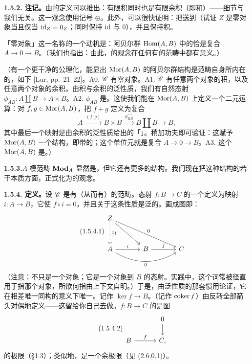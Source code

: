 \textbf{1.5.2. 注记。}\quad 由\trAdditiveCategory{}的定义可以推出：有限积同时也是有限余积（即和）——细节与我们无关。这一观念使用记号 $\oplus$。此外，可以很快证明：\trAdditiveFunctor{}把\trZeroObject{}送到\trZeroObject{}（试证 $Z$ 是零对象当且仅当 $\mathrm{id}_Z=0_Z$；\trAdditiveFunctor{}同时保持 $\mathrm{id}$ 与 $0$），并且保持积。

「零对象」这一名称的一个动机是：阿贝尔群 $\operatorname{Hom}(A,B)$ 中的\trZeroMorphism{}恰是复合 $A\to 0\to B$。（我们也指出：由此，\trZeroMorphism{}的观念在任何有\trZeroObject{}的范畴中都有意义。）

（有一个更干净的公理化，能显出 $\operatorname{Mor}(A,B)$ 的阿贝尔群结构是范畴自身所内在的，如下 [Lur, pp.~21--22]。A0. $\mathscr{C}$ 有零对象。A1. $\mathscr{C}$ 有任意两个对象的积，以及任意两个对象的余积。由积与余积的泛性质，我们有自然态射 $\phi_{AB}\colon A\amalg B\to A\times B$。A2. $\phi_{AB}$ 是\trIsomorphism。这使我们能在 $\operatorname{Mor}(A,B)$ 上定义一个二元运算：对 $f,g\in\operatorname{Mor}(A,B)$，把 $f+g$ 定义为复合
\[
A \mathrel{\xrightarrow{\ (f,g)\ }} B\times B \mathrel{\xrightarrow{\ \phi_{BB}^{-1}\ }} B\amalg B \longrightarrow B,
\]
其中最后一个映射是由余积的泛性质给出的「\trCodiagonal」。稍加功夫即可验证：这赋予 $\operatorname{Mor}(A,B)$ 一个\trCommutativeMonoid{}结构，即带\trUnit{}的\trAbelianSemigroup；这个单位元就是复合 $A\to 0\to B$。A3. 这个\trCommutativeMonoid{} $\operatorname{Mor}(A,B)$ 是\trAbelianGroups。）

\textbf{1.5.3.}\quad $A$-模范畴 $\mathbf{Mod}_{A}$ 显然是\trAdditiveCategory，但它还有更多的结构。我们现在把这种结构的若干本质方面，正式化为\trAbelianCategory{}的观念。

\textbf{1.5.4. 定义。}\quad 设 $\mathscr{C}$ 是有\trZeroObject（从而有\trZeroMorphism）的范畴。态射 $f\colon B\to C$ 的一个\trKernel{}定义为映射 $i\colon A\to B$，它使 $f\circ i=0$，并且关于这条性质是泛的。画成图即：
\begin{equation*}\tag{1.5.4.1}\label{eq:kernel-universal-property-diagram}
\begin{tikzcd}[row sep=1.55em, column sep=3.6em]
Z \ar[dd,dotted,"\exists!"] \ar[ddr] \ar[ddrr,"0"] & & \\
 & & \\
A \ar[r,"i"] \ar[rr,bend right=30,"0"'] & B \ar[r,"f"] & C
\end{tikzcd}
\end{equation*}
（注意：\trKernel{}不只是一个对象；它是一个对象到 $B$ 的态射。实践中，这个词常被径直用于指那个对象，所欲何指由上下文自明。）于是，由泛性质的那套惯用论证，它在相差唯一同构的意义下唯一。\trKernel{}记作 $\ker f\to B$。\trCokernel{}（记作 $\operatorname{coker} f$）由反转全部箭头对偶地定义——这留给你自己去做。$f\colon B\to C$ 的\trKernel{}是图
\begin{equation*}\tag{1.5.4.2}\label{eq:kernel-as-limit-square}
\begin{tikzcd}[row sep=1.7em, column sep=3.2em]
 & 0 \ar[d] \\
B \ar[r,"f"] & C,
\end{tikzcd}
\end{equation*}
的极限（\S1.3）；类似地，\trCokernel{}是一个余极限（见 (2.6.0.1)）。


